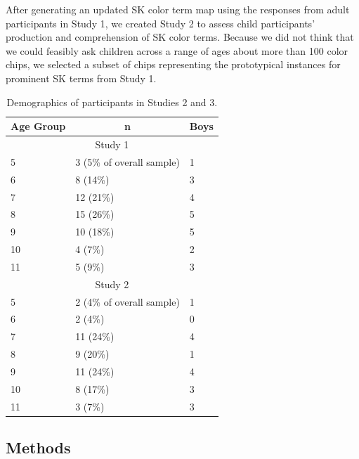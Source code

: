 \documentclass[
  english,
  ,man,floatsintext]{apa6}
\begin{document}
After generating an updated SK color term map using the responses from adult participants in Study 1, we created Study 2 to assess child participants' production and comprehension of SK color terms. Because we did not think that we could feasibly ask children across a range of ages about more than 100 color chips, we selected a subset of chips representing the prototypical instances for prominent SK terms from Study 1.

\begin{table}[tbp]

\begin{center}
\begin{threeparttable}

\caption{\label{tab:study23-demographics}Demographics of participants in Studies 2 and 3.}

\begin{tabular}{lll}
\toprule
Age Group & \multicolumn{1}{c}{n} & \multicolumn{1}{c}{Boys}\\
\midrule
\multicolumn{3}{c}{Study 1}\\
5 & 3 (5\% of overall sample) & 1\\
6 & 8 (14\%) & 3\\
7 & 12 (21\%) & 4\\
8 & 15 (26\%) & 5\\
9 & 10 (18\%) & 5\\
10 & 4 (7\%) & 2\\
11 & 5 (9\%) & 3\\
\multicolumn{3}{c}{Study 2}\\
5 & 2 (4\% of overall sample) & 1\\
6 & 2 (4\%) & 0\\
7 & 11 (24\%) & 4\\
8 & 9 (20\%) & 1\\
9 & 11 (24\%) & 4\\
10 & 8 (17\%) & 3\\
11 & 3 (7\%) & 3\\
\bottomrule
\end{tabular}

\end{threeparttable}
\end{center}

\end{table}

\hypertarget{methods-1}{%
\subsection{Methods}\label{methods-1}}
\end{document}

